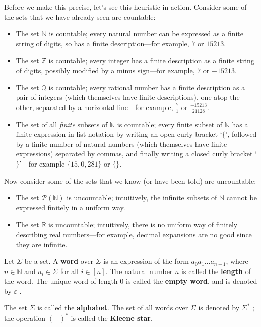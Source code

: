 Before we make this precise, let's see this heuristic in action. Consider some of the sets that we have already seen are countable:
\begin{itemize}
\item The set $\mathbb{N}$ is countable; every natural number can be expressed as a finite string of digits, so has a finite description---for example, $7$ or $15213$.
\item The set $\mathbb{Z}$ is countable; every integer has a finite description as a finite string of digits, possibly modified by a minus sign---for example, $7$ or $-15213$.
\item The set $\mathbb{Q}$ is countable; every rational number has a finite description as a pair of integers (which themselves have finite descriptions), one atop the other, separated by a horizontal line---for example, $\frac{7}{1}$ or $\frac{-15213}{21128}$.
\item The set of all \textit{finite} subsets of $\mathbb{N}$ is countable; every finite subset of $\mathbb{N}$ has a finite expression in list notation by writing an open curly bracket `$\{$', followed by a finite number of natural numbers (which themselves have finite expressions) separated by commas, and finally writing a closed curly bracket `$\}$'---for example $\{ 15, 0, 281 \}$ or $\{ \}$.
\end{itemize}

Now consider some of the sets that we know (or have been told) are uncountable:
\begin{itemize}
\item The set $\mathcal{P}(\mathbb{N})$ is uncountable; intuitively, the infinite subsets of $\mathbb{N}$ cannot be expressed finitely in a uniform way.
\item The set $\mathbb{R}$ is uncountable; intuitively, there is no uniform way of finitely describing real numbers---for example, decimal expansions are no good since they are infinite.
\end{itemize}

\begin{definition}
\label{defKleeneStar}
Let $\Sigma$ be a set. A \textbf{word} over $\Sigma$ is an expression of the form $a_0 a_1 \dots a_{n-1}$, where $n \in \mathbb{N}$ and $a_i \in \Sigma$ for all $i \in [n]$. The natural number $n$ is called the \textbf{length} of the word. The unique word of length $0$ is called the \textbf{empty word}, and is denoted by $\varepsilon$ .

The set $\Sigma$ is called the \textbf{alphabet}. The set of all words over $\Sigma$ is denoted by $\Sigma^*$ ; the operation $(-)^*$ is called the \textbf{Kleene star}.
\end{definition}

